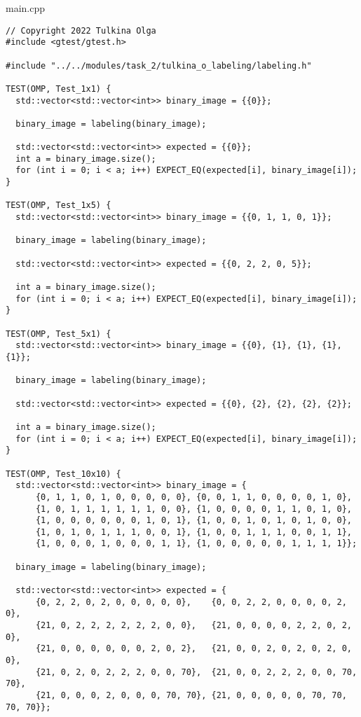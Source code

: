 \documentclass[12pt]{article}
\begin{document}
main.cpp
\begin{lstlisting}
// Copyright 2022 Tulkina Olga
#include <gtest/gtest.h>

#include "../../modules/task_2/tulkina_o_labeling/labeling.h"

TEST(OMP, Test_1x1) {
  std::vector<std::vector<int>> binary_image = {{0}};

  binary_image = labeling(binary_image);

  std::vector<std::vector<int>> expected = {{0}};
  int a = binary_image.size();
  for (int i = 0; i < a; i++) EXPECT_EQ(expected[i], binary_image[i]);
}

TEST(OMP, Test_1x5) {
  std::vector<std::vector<int>> binary_image = {{0, 1, 1, 0, 1}};

  binary_image = labeling(binary_image);

  std::vector<std::vector<int>> expected = {{0, 2, 2, 0, 5}};

  int a = binary_image.size();
  for (int i = 0; i < a; i++) EXPECT_EQ(expected[i], binary_image[i]);
}

TEST(OMP, Test_5x1) {
  std::vector<std::vector<int>> binary_image = {{0}, {1}, {1}, {1}, {1}};

  binary_image = labeling(binary_image);

  std::vector<std::vector<int>> expected = {{0}, {2}, {2}, {2}, {2}};

  int a = binary_image.size();
  for (int i = 0; i < a; i++) EXPECT_EQ(expected[i], binary_image[i]);
}

TEST(OMP, Test_10x10) {
  std::vector<std::vector<int>> binary_image = {
      {0, 1, 1, 0, 1, 0, 0, 0, 0, 0}, {0, 0, 1, 1, 0, 0, 0, 0, 1, 0},
      {1, 0, 1, 1, 1, 1, 1, 1, 0, 0}, {1, 0, 0, 0, 0, 1, 1, 0, 1, 0},
      {1, 0, 0, 0, 0, 0, 0, 1, 0, 1}, {1, 0, 0, 1, 0, 1, 0, 1, 0, 0},
      {1, 0, 1, 0, 1, 1, 1, 0, 0, 1}, {1, 0, 0, 1, 1, 1, 0, 0, 1, 1},
      {1, 0, 0, 0, 1, 0, 0, 0, 1, 1}, {1, 0, 0, 0, 0, 0, 1, 1, 1, 1}};

  binary_image = labeling(binary_image);

  std::vector<std::vector<int>> expected = {
      {0, 2, 2, 0, 2, 0, 0, 0, 0, 0},    {0, 0, 2, 2, 0, 0, 0, 0, 2, 0},
      {21, 0, 2, 2, 2, 2, 2, 2, 0, 0},   {21, 0, 0, 0, 0, 2, 2, 0, 2, 0},
      {21, 0, 0, 0, 0, 0, 0, 2, 0, 2},   {21, 0, 0, 2, 0, 2, 0, 2, 0, 0},
      {21, 0, 2, 0, 2, 2, 2, 0, 0, 70},  {21, 0, 0, 2, 2, 2, 0, 0, 70, 70},
      {21, 0, 0, 0, 2, 0, 0, 0, 70, 70}, {21, 0, 0, 0, 0, 0, 70, 70, 70, 70}};


\end{lstlisting}
\end{document}
